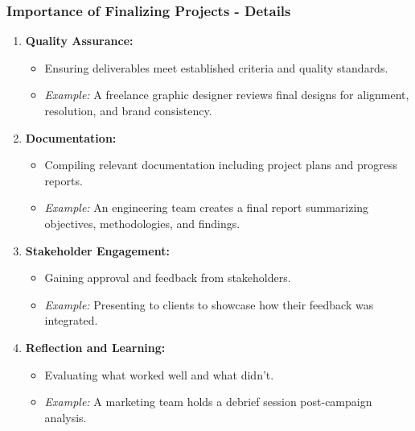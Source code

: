 \documentclass{beamer}
\begin{document}
\begin{frame}[fragile]
    \frametitle{Importance of Finalizing Projects - Details}
    \begin{enumerate}
        \item \textbf{Quality Assurance:} 
            \begin{itemize}
                \item Ensuring deliverables meet established criteria and quality standards.
                \item \textit{Example:} A freelance graphic designer reviews final designs for alignment, resolution, and brand consistency.
            \end{itemize}
        
        \item \textbf{Documentation:} 
            \begin{itemize}
                \item Compiling relevant documentation including project plans and progress reports.
                \item \textit{Example:} An engineering team creates a final report summarizing objectives, methodologies, and findings.
            \end{itemize}
        
        \item \textbf{Stakeholder Engagement:} 
            \begin{itemize}
                \item Gaining approval and feedback from stakeholders.
                \item \textit{Example:} Presenting to clients to showcase how their feedback was integrated.
            \end{itemize}
        
        \item \textbf{Reflection and Learning:} 
            \begin{itemize}
                \item Evaluating what worked well and what didn't.
                \item \textit{Example:} A marketing team holds a debrief session post-campaign analysis.
            \end{itemize}
    \end{enumerate}
\end{frame}
\end{document}
